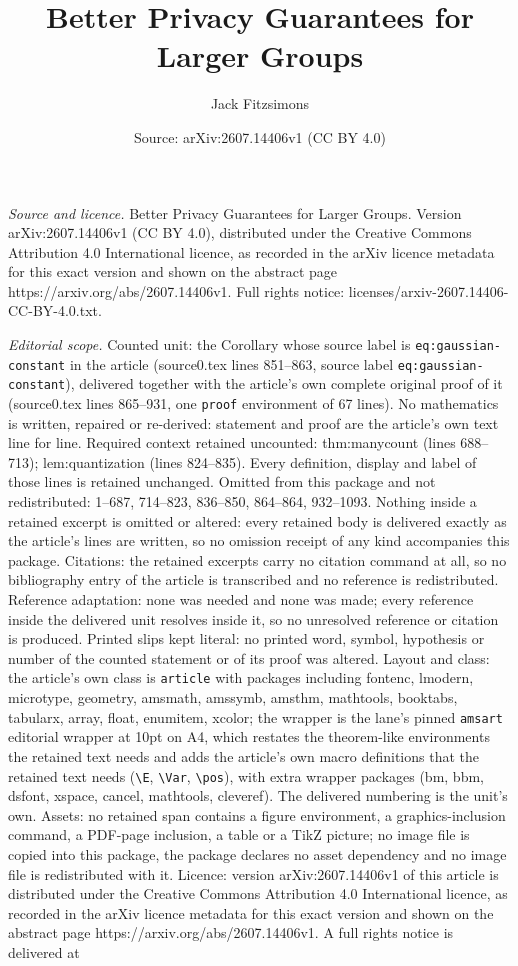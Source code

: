 \documentclass[10pt,a4paper]{amsart}
\title[Better Privacy Guarantees for Larger Groups]{Better Privacy Guarantees for Larger Groups}
\author{Jack Fitzsimons}
\date{Source: arXiv:2607.14406v1 (CC BY 4.0)}
\begin{document}
\maketitle

\noindent\emph{Source and licence.} Better Privacy Guarantees for Larger Groups. Version arXiv:2607.14406v1 (CC BY 4.0), distributed under the Creative Commons Attribution 4.0 International licence, as recorded in the arXiv licence metadata for this exact version and shown on the abstract page https://arxiv.org/abs/2607.14406v1. Full rights notice: licenses/arxiv-2607.14406-CC-BY-4.0.txt.\par\smallskip

\noindent\textit{Editorial scope.} Counted unit: the Corollary whose source label is \texttt{eq:gaussian-constant} in the article (source0.tex lines 851--863, source label \texttt{eq:gaussian-constant}), delivered together with the article's own complete original proof of it (source0.tex lines 865--931, one \texttt{proof} environment of 67 lines). No mathematics is written, repaired or re-derived: statement and proof are the article's own text line for line. Required context retained uncounted: thm:manycount (lines 688--713); lem:quantization (lines 824--835). Every definition, display and label of those lines is retained unchanged. Omitted from this package and not redistributed: 1--687, 714--823, 836--850, 864--864, 932--1093. Nothing inside a retained excerpt is omitted or altered: every retained body is delivered exactly as the article's lines are written, so no omission receipt of any kind accompanies this package. Citations: the retained excerpts carry no citation command at all, so no bibliography entry of the article is transcribed and no reference is redistributed. Reference adaptation: none was needed and none was made; every reference inside the delivered unit resolves inside it, so no unresolved reference or citation is produced. Printed slips kept literal: no printed word, symbol, hypothesis or number of the counted statement or of its proof was altered. Layout and class: the article's own class is \texttt{article} with packages including fontenc, lmodern, microtype, geometry, amsmath, amssymb, amsthm, mathtools, booktabs, tabularx, array, float, enumitem, xcolor; the wrapper is the lane's pinned \texttt{amsart} editorial wrapper at 10pt on A4, which restates the theorem-like environments the retained text needs and adds the article's own macro definitions that the retained text needs (\texttt{\textbackslash E}, \texttt{\textbackslash Var}, \texttt{\textbackslash pos}), with extra wrapper packages (bm, bbm, dsfont, xspace, cancel, mathtools, cleveref). The delivered numbering is the unit's own. Assets: no retained span contains a figure environment, a graphics-inclusion command, a PDF-page inclusion, a table or a TikZ picture; no image file is copied into this package, the package declares no asset dependency and no image file is redistributed with it. Licence: version arXiv:2607.14406v1 of this article is distributed under the Creative Commons Attribution 4.0 International licence, as recorded in the arXiv licence metadata for this exact version and shown on the abstract page https://arxiv.org/abs/2607.14406v1. A full rights notice is delivered at 
\end{document}
